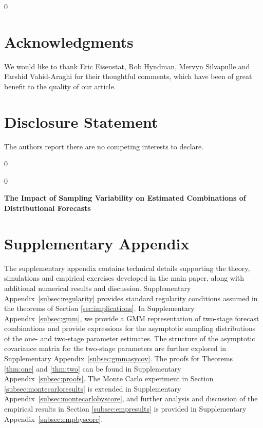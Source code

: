 \documentclass[12pt]{article}
\newcommand{\blind}{0}
\theoremstyle{definition}
\theoremstyle{remark}
\renewcommand{\appendixname}{Supplementary Appendix}
\begin{document}
\blind
{
\section*{Acknowledgments}
We would like to thank Eric Eisenstat, Rob Hyndman, Mervyn Silvapulle and Farshid Vahid-Araghi for their thoughtful comments, which have been of great benefit to the quality of our article.

\section*{Disclosure Statement}
The authors report there are no competing interests to declare.
}\fi

{
\footnotesize


}

\newpage


\blind
{
  \setcounter{footnote}{0}
  \renewcommand{\thefootnote}{\fnsymbol{footnote}}
  \maketitle
  \footnotetext[1]{\funding}
  \footnotetext[2]{\ebsaffiliation}
  \footnotetext[3]{\mdaffiliation}
  \footnotetext[4]{\correspondingauthor}
  \renewcommand{\thefootnote}{\arabic{footnote}}
} \fi

\blind
{
  \bigskip
  \bigskip
  \bigskip
  \begin{center}
    {\LARGE\bf The Impact of Sampling Variability on Estimated Combinations of Distributional Forecasts}
\end{center}
  \medskip
} \fi

\appendix

\section*{\centering \appendixname}
\setcounter{section}{1}

The supplementary appendix contains technical details supporting the theory, simulations and empirical exercises developed in the main paper, along with additional numerical results and discussion. \appendixname\ \ref{subsec:regularity} provides standard regularity conditions assumed in the theorems of Section \ref{sec:implications}. In \appendixname\ \ref{subsec:gmm}, we provide a GMM representation of two-stage forecast combinations and provide expressions for the asymptotic sampling distributions of the one- and two-stage parameter estimates. The structure of the asymptotic covariance matrix for the two-stage parameters are further explored in \appendixname\ \ref{subsec:gmmasycov}. The proofs for Theorems \ref{thm:one} and \ref{thm:two} can be found in \appendixname\ \ref{subsec:proofs}. The Monte Carlo experiment in Section \ref{subsec:montecarloresults} is extended in \appendixname\ \ref{subsec:montecarlobyscore}, and further analysis and discussion of the empirical results in Section \ref{subsec:empresults} is provided in \appendixname\ \ref{subsec:empbyscore}.
\end{document}
